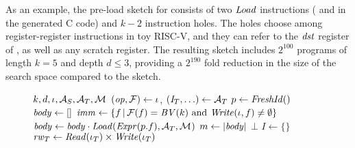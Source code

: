 As an example, the pre-load sketch for  consists of two $\mathit{Load}$
instructions ( and  in the generated C code) and $k-2$
instruction holes.  The holes choose among register-register instructions in toy
RISC-V, and they can refer to the $\mathit{dst}$ register of , as
well as any scratch register. The resulting sketch includes $2^{100}$ programs
of length $k = 5$ and depth $d\leq 3$, providing a $2^{190}$ fold reduction in
the size of the search space compared to the \RW sketch.\tighten

\begin{figure}[h]
  \begin{algorithmic}[1] 
      {$k, d, \iota, \mathcal{A}_S, \mathcal{A}_T, \mathcal{M}_{}$}
      \State $(\mathit{op}, \mathcal{F}) \gets \iota$, $(\mathit{I}_T, \ldots) \gets \mathcal{A}_T$ 
      \State $p \gets \mathit{FreshId}()$ 
      \State $\mathit{body}\gets []$  
      \State $\mathit{imm} \gets \{ f \,|\, \mathcal{F}(f) = \mathit{BV}(k) \text{ and } \mathit{Write}(\iota,f) \neq \emptyset \}$ 
       
        \State $\mathit{body}\gets\mathit{body}\cdot \mathit{Load}(\mathit{Expr}(p.f), \mathcal{A}_T, \mathcal{M}_{})$ 
      \EndFor
      \State $m \gets |\mathit{body}|$ 
       \Return $\bot$ 
      \EndIf
       
        \State $I \gets \{\}$  
           
         \State $\mathit{rw}_T \gets  \mathit{Read}(\iota_T) \times \mathit{Write}(\iota_T)$ 

\end{algorithmic}
\end{figure}
